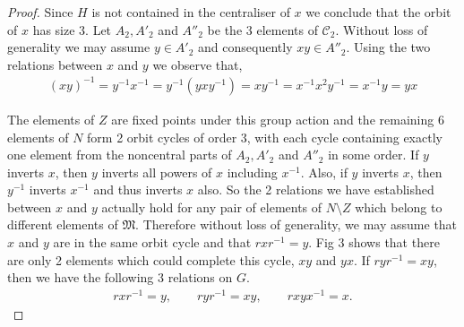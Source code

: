 \documentclass[a4paper , 11pt]{book}
\theoremstyle{definition}
\theoremstyle{remark}
\begin{document}
\begin{proof}
Since $H$ is not contained in the centraliser of $x$ we conclude that the orbit of $x$ has size 3. Let $A_2, A'_2$ and $A''_2$ be the 3 elements of $\mathcal{C}_2$. Without loss of generality we may assume $y \in A'_2$ and consequently $xy \in A''_2$. Using the two relations between $x$ and $y$ we observe that,
\begin{align*} (xy)^{-1} = y^{-1} x^{-1} = y^{-1} (y x y^{-1}) = x y^{-1} = x^{-1} x^2 y^{-1} = x^{-1} y = yx
\end{align*}

\begin{center}
\end{center}

The elements of $Z$ are fixed points under this group action and the remaining 6 elements of $N$ form 2 orbit cycles of order 3, with each cycle containing exactly one element from the noncentral parts of $A_2, A'_2$ and $A''_2$ in some order. If $y$ inverts $x$, then $y$ inverts all powers of $x$ including $x^{-1}$. Also, if $y$ inverts $x$, then $y^{-1}$ inverts $x^{-1}$ and thus inverts $x$ also. So the 2 relations we have established between $x$ and $y$ actually hold for any pair of elements of $N \! \setminus \! Z$ which belong to different elements of $\mathfrak{M}$. Therefore without loss of generality, we may assume that $x$ and $y$ are in the same orbit cycle and that $r x r^{-1} = y$. Fig 3 shows that there are only 2 elements which could complete this cycle, $xy$ and $yx$. If $r y r^{-1} = xy$, then we have the following 3 relations on $G$.
\begin{align}\label{3rel} r x r^{-1} = y, \qquad r y r^{-1} = xy, \qquad r xy x^{-1} = x.
\end{align}


\end{proof}
\end{document}
